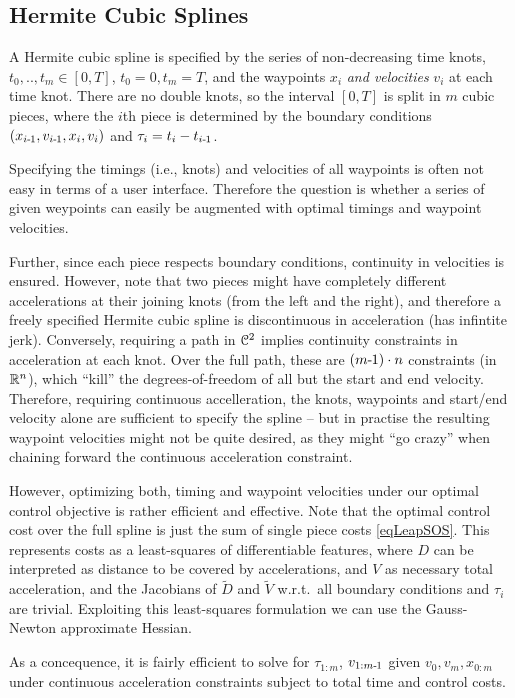 \subsection{Hermite Cubic Splines}

A Hermite cubic spline is specified by the series of non-decreasing
time knots, $t_0,..,t_m \in [0,T]$, $t_0=0, t_m=T$, and the waypoints
$x_i$ \emph{and velocities} $v_i$ at each time knot. There are no
double knots, so the interval $[0,T]$ is split in $m$ cubic pieces,
where the $i$th piece is determined by the boundary conditions
$(x_{i{{\hspace*{-.0pt}\text{\rm -}\hspace*{-.5pt}}1}},v_{i{{\hspace*{-.0pt}\text{\rm -}\hspace*{-.5pt}}1}}, x_i, v_i)$ and $\tau_i = t_i - t_{i{{\hspace*{-.0pt}\text{\rm -}\hspace*{-.5pt}}1}}$.

Specifying the timings (i.e., knots) and velocities of all waypoints
is often not easy in terms of a user interface. Therefore the question
is whether a series of given weypoints can easily be augmented with
optimal timings and waypoint velocities.

Further, since each piece respects boundary conditions, continuity in
velocities is ensured. However, note that two pieces might have
completely different accelerations at their joining knots (from the
left and the right), and therefore a freely specified Hermite cubic
spline is discontinuous in acceleration (has infintite
jerk). Conversely, requiring a path in ${\cal C}^2$ implies continuity
constraints in acceleration at each knot. Over the full path, these
are $(m{{\hspace*{-.0pt}\text{\rm -}\hspace*{-.5pt}}1}) \cdot n$ constraints (in ${\mathbb{R}}^n$), which ``kill'' the
degrees-of-freedom of all but the start and end velocity. Therefore,
requiring continuous accelleration, the knots, waypoints and start/end
velocity alone are sufficient to specify the spline -- but in practise
the resulting waypoint velocities might not be quite desired, as they
might ``go crazy'' when chaining forward the continuous acceleration
constraint.

However, optimizing both, timing and waypoint velocities under our
optimal control objective is rather efficient and effective. Note that
the optimal control cost over the full spline is just the sum of
single piece costs \eqref{eqLeapSOS}. This represents costs as a
least-squares of differentiable features, where $D$ can be interpreted
as distance to be covered by accelerations, and $V$ as necessary total
acceleration, and the Jacobians of $\tilde D$ and $\tilde V$
w.r.t.\ all boundary conditions and $\tau_i$ are trivial. Exploiting
this least-squares formulation we can use the Gauss-Newton
approximate Hessian.

As a concequence, it is fairly efficient to solve for $\tau_{1:m}$,
$v_{1:m{{\hspace*{-.0pt}\text{\rm -}\hspace*{-.5pt}}1}}$ given $v_0, v_m, x_{0:m}$ under continuous acceleration
constraints subject to total time and control costs.


